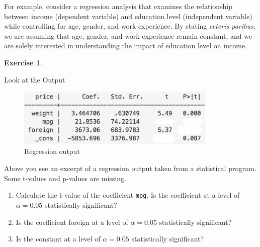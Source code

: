 \documentclass[
  12pt,
  oneside]{book}
\providecommand{\tightlist}{%
  \setlength{\itemsep}{0pt}\setlength{\parskip}{0pt}}
\theoremstyle{definition}
\theoremstyle{definition}
\theoremstyle{definition}
\newtheorem{exercise}{Exercise}[chapter]
\theoremstyle{definition}
\theoremstyle{remark}
\begin{document}
For example, consider a regression analysis that examines the relationship between income (dependent variable) and education level (independent variable) while controlling for age, gender, and work experience. By stating \emph{ceteris paribus}, we are assuming that age, gender, and work experience remain constant, and we are solely interested in understanding the impact of education level on income.

\begin{exercise}
\protect\hypertarget{exr:lookatoutput}{}\label{exr:lookatoutput}

Look at the Output

\begin{figure}
\centering
\includegraphics[width=0.85\textwidth,height=\textheight]{fig/reg_stata2.png}
\caption{\label{fig:regstata2} Regression output}
\end{figure}

Above you see an excerpt of a regression output taken from a statistical program. Some t-values and p-values are missing.

\begin{enumerate}
\def\labelenumi{\alph{enumi})}
\tightlist
\item
  Calculate the t-value of the coefficient \texttt{mpg}. Is the coefficient at a level of \(\alpha=0.05\) statistically significant?\\
\item
  Is the coefficient foreign at a level of \(\alpha=0.05\) statistically significant?\\
\item
  Is the constant at a level of \(\alpha=0.05\) statistically significant?
\end{enumerate}

\end{exercise}
\end{document}
